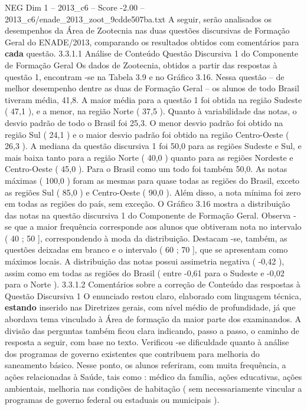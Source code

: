 \begin{textsample}{NEG Dim 1 – 2013\_c6 – Score -2.00 – 2013\_c6/enade\_2013\_zoot\_9cdde507ba.txt}
A seguir, serão analisados os desempenhos da Área de Zootecnia nas duas questões discursivas de Formação Geral do ENADE/2013, comparando os resultados obtidos com comentários para \textbf{cada} questão. 3.3.1.1 Análise de Conteúdo Questão Discursiva 1 do Componente de Formação Geral Os dados de Zootecnia, obtidos a partir das respostas à questão 1, encontram -se na Tabela 3.9 e no Gráfico 3.16.
Nessa questão – de melhor desempenho dentre as duas de Formação Geral – os alunos de todo Brasil tiveram média, 41,8.
A maior média para a questão 1 foi obtida na região Sudeste ( 47,1 ), e a menor, na região Norte ( 37,5 ).
Quanto à variabilidade das notas, o desvio padrão de todo o Brasil foi 25,3.
O menor desvio padrão foi obtido na região Sul ( 24,1 ) e o maior desvio padrão foi obtido na região Centro-Oeste ( 26,3 ).
A mediana da questão discursiva 1 foi 50,0 para as regiões Sudeste e Sul, e mais baixa tanto para a região Norte ( 40,0 ) quanto para as regiões Nordeste e Centro-Oeste ( 45,0 ).
Para o Brasil como um todo foi também 50,0.
As notas máximas ( 100,0 ) foram as mesmas para quase todas as regiões do Brasil, exceto as regiões Sul ( 85,0 ) e Centro-Oeste ( 90,0 ).
Além disso, a nota mínima foi zero em todas as regiões do país, sem exceção.
O Gráfico 3.16 mostra a distribuição das notas na questão discursiva 1 do Componente de Formação Geral.
Observa -se que a maior frequência corresponde aos alunos que obtiveram nota no intervalo ( 40 ; 50 ], correspondendo à moda da distribuição.
Destacam -se, também, as questões deixadas em branco e o intervalo ( 60 ; 70 ], que se apresentam como máximos locais.
A distribuição das notas possui assimetria negativa ( -0,42 ), assim como em todas as regiões do Brasil ( entre -0,61 para o Sudeste e -0,02 para o Norte ). 3.3.1.2 Comentários sobre a correção de Conteúdo das respostas à Questão Discursiva 1 O enunciado restou claro, elaborado com linguagem técnica, \textbf{estando} inserido nas Diretrizes gerais, com nível médio de profundidade, já que abordava tema vinculado à Área de formação da maior parte dos examinandos.
A divisão das perguntas também ficou clara indicando, passo a passo, o caminho de resposta a seguir, com base no texto.
Verificou -se dificuldade quanto à análise dos programas de governo existentes que contribuem para melhoria do saneamento básico.
Nesse ponto, os alunos referiram, com muita frequência, a ações relacionadas à Saúde, tais como : médico da família, ações educativas, ações ambientais, melhoria nas condições de habitação ( sem necessariamente vincular a programas de governo federal ou estaduais ou municipais ).

\end{textsample}
